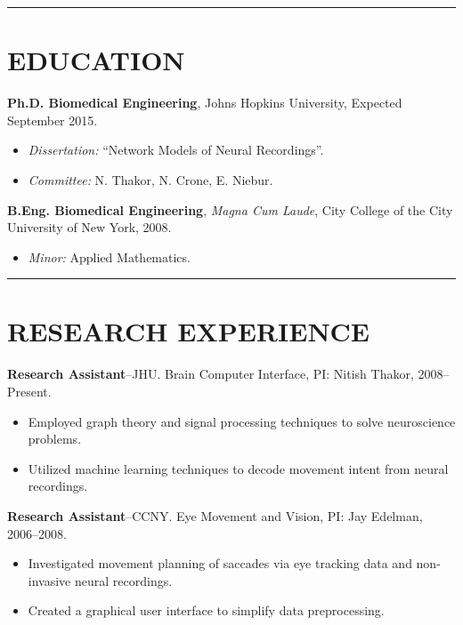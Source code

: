 \documentclass[margin]{res}
\begin{document}
\begin{resume}

\bigskip
\rule{\resumewidth}{2mm}  %

\section{\MakeUppercase{Education}}

\textbf{Ph.D. Biomedical Engineering}, Johns Hopkins University, Expected September 2015.
\begin{itemize}
    \item \emph{Dissertation:} ``Network Models of Neural Recordings''.
    \item \emph{Committee:} N. Thakor, N. Crone, E. Niebur.
\end{itemize}
\textbf{B.Eng. Biomedical Engineering}, \textit{Magna Cum Laude},
    City College of the City University of New York, 2008.
\begin{itemize}
	    \item \emph{Minor:} Applied Mathematics.
\end{itemize}
    
\rule{\linewidth}{1mm}  %

\section{\MakeUppercase{Research Experience}}

\textbf{Research Assistant}--JHU. 
Brain Computer Interface, 
PI: Nitish Thakor, 2008--Present.
\begin{itemize}
	\item Employed graph theory and signal processing techniques to solve neuroscience problems.
	\item Utilized machine learning techniques to decode movement intent from neural recordings.
\end{itemize}

\textbf{Research Assistant}--CCNY. 
Eye Movement and Vision, 
PI: Jay Edelman, 2006--2008.
\begin{itemize}
	\item Investigated movement planning of saccades via eye tracking data and non-invasive neural recordings.
	\item Created a graphical user interface to simplify data preprocessing.
\end{itemize}
	 

\end{resume}
\end{document}

